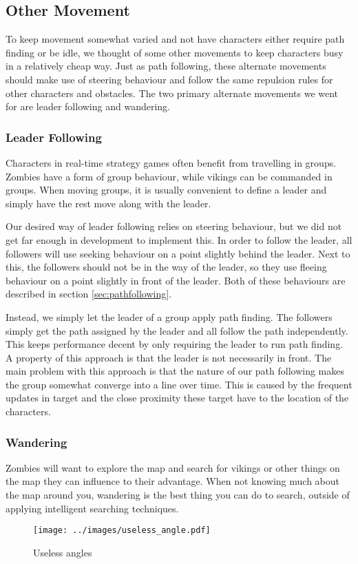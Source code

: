 \subsection{Other Movement}
To keep movement somewhat varied and not have characters either require path finding or be idle, we thought of some other movements to keep characters busy in a relatively cheap way. Just as path following, these alternate movements should make use of steering behaviour and follow the same repulsion rules for other characters and obstacles. The two primary alternate movements we went for are leader following and wandering.

\subsubsection{Leader Following}
Characters in real-time strategy games often benefit from travelling in groups. Zombies have a form of group behaviour, while vikings can be commanded in groups. When moving groups, it is usually convenient to define a leader and simply have the rest move along with the leader.

Our desired way of leader following relies on steering behaviour, but we did not get far enough in development to implement this. In order to follow the leader, all followers will use seeking behaviour on a point slightly behind the leader. Next to this, the followers should not be in the way of the leader, so they use fleeing behaviour on a point slightly in front of the leader. Both of these behaviours are described in section \ref{sec:pathfollowing}.

Instead, we simply let the leader of a group apply path finding. The followers simply get the path assigned by the leader and all follow the path independently. This keeps performance decent by only requiring the leader to run path finding. A property of this approach is that the leader is not necessarily in front. The main problem with this approach is that the nature of our path following makes the group somewhat converge into a line over time. This is caused by the frequent updates in target and the close proximity these target have to the location of the characters.

\subsubsection{Wandering}
Zombies will want to explore the map and search for vikings or other things on the map they can influence to their advantage. When not knowing much about the map around you, wandering is the best thing you can do to search, outside of applying intelligent searching techniques. 
\begin{wrapfigure}{r}{0.30\textwidth}
\texttt{[image: ../images/useless\_angle.pdf]}
\caption{Useless angles}
\label{fig:tangents}
\end{wrapfigure}

